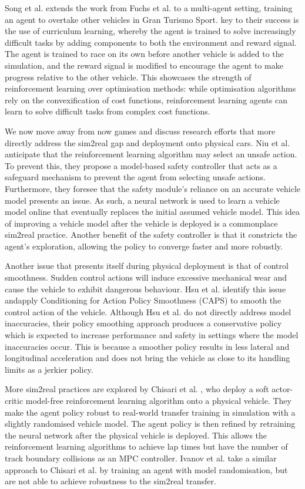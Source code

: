 Song et al. \cite{Song2021} extends the work from Fuchs et al. \cite{Fuchs2021} to a multi-agent setting, training an agent to overtake other vehicles in Gran Turismo Sport.
key to their success is the use of curriculum learning, whereby the agent is trained to solve increasingly difficult tasks by adding components to both the environment and reward signal. 
The agent is trained to race on its own before another vehicle is added to the simulation, and the reward signal is modified to encourage the agent to make progress relative to the other vehicle.
This showcases the strength of reinforcement learning over optimisation methods: while optimisation algorithms rely on the convexification of cost functions, reinforcement learning agents can learn to solve difficult tasks from complex cost functions.


We now move away from now games and discuss research efforts that more directly address the sim2real gap and deployment onto physical cars.
Niu et al. \cite{Niu2020} anticipate that the reinforcement learning algorithm may select an unsafe action.
To prevent this, they propose a model-based safety controller that acts as a safeguard mechanism to prevent the agent from selecting unsafe actions.
Furthermore, they foresee that the safety module's reliance on an accurate vehicle model presents an issue. 
As such, a neural network is used to learn a vehicle model online that eventually replaces the initial assumed vehicle model.
This idea of improving a vehicle model after the vehicle is deployed is a commonplace sim2real practice.
Another benefit of the safety controller is that it constricts the agent's exploration, allowing the policy to converge faster and more robustly.


Another issue that presents itself during physical deployment is that of control smoothness. 
Sudden control actions will induce excessive mechanical wear and cause the vehicle to exhibit dangerous behaviour.
Hsu et al. \cite{hsu2022} identify this issue andapply Conditioning for Action Policy Smoothness (CAPS) to smooth the control action of the vehicle.
Although Hsu et al. \cite{hsu2022} do not directly address model inaccuracies, their policy smoothing approach produces a conservative policy which is expected to increase performance and safety in settings where the model inaccuracies occur.
This is because a smoother policy results in less lateral and longitudinal acceleration and does not bring the vehicle as close to its handling limits as a jerkier policy.


More sim2real practices are explored by Chisari et al. \cite{Chisari2021}, who deploy a soft actor-critic model-free reinforcement learning algorithm onto a physical vehicle.
They make the agent policy robust to real-world transfer training in simulation with a slightly randomised vehicle model.
The agent policy is then refined by retraining the neural network after the physical vehicle is deployed.
This allows the reinforcement learning algorithms to achieve lap times but have the number of track boundary collisions as an MPC controller.
Ivanov et al. \cite{Ivanov2020} take a similar approach to Chisari et al. \cite{Chisari2021} by training an agent with model randomisation, but are not able to achieve robustness to the sim2real transfer.


